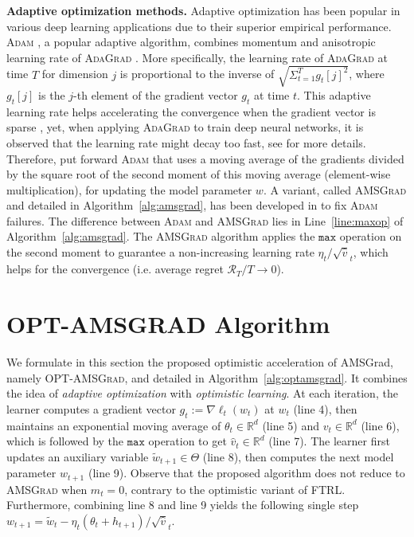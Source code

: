 \documentclass[wcp]{jmlr}
\begin{document}
\textbf{Adaptive optimization methods.}\hspace{0.1cm}
Adaptive optimization has been popular in various deep learning applications due to their superior empirical performance.
\textsc{Adam} \citep{KB15}, a popular adaptive algorithm, combines momentum \citep{P64} and anisotropic learning rate of \textsc{AdaGrad} \citep{DHS11}.
More specifically, the learning rate of \textsc{AdaGrad} at time $T$ for dimension $j$ is proportional to the inverse of $\sqrt{ \Sigma_{t=1}^T g_t[j]^2 }$, where $g_t[j]$ is the $j$-th element of the gradient vector $g_t$ at time $t$.
This adaptive learning rate helps accelerating the convergence when the gradient vector is sparse \citep{DHS11}, yet, when applying \textsc{AdaGrad} to train deep neural networks, it is observed that the learning rate might decay too fast, see \citep{KB15} for more details.
Therefore, \cite{KB15} put forward \textsc{Adam} that uses a moving average of the gradients divided by the square root of the second moment of this moving average (element-wise multiplication), for updating the model parameter $w$.
A variant, called \textsc{AMSGrad} and detailed in Algorithm~\ref{alg:amsgrad}, has been developed in \citep{RKK18} to fix \textsc{Adam} failures.
The difference between \textsc{Adam} and \textsc{AMSGrad} lies in Line~\ref{line:maxop} of Algorithm~\ref{alg:amsgrad}.
The \textsc{AMSGrad} algorithm \citep{RKK18} applies the $\texttt{max}$ operation on the second moment to guarantee a non-increasing learning rate $\eta_t / \sqrt{\hat{v}}_t $, which helps for the convergence (i.e. average regret $\mathcal{R}_T/T \rightarrow 0$).


\section{\textsc{OPT-AMSGRAD} Algorithm}\label{sec:opt}
\vspace{-0.05in}





We formulate in this section the proposed optimistic acceleration of AMSGrad, namely \textsc{OPT-AMSGrad}, and detailed in Algorithm~\ref{alg:optamsgrad}.  
It combines the idea of \emph{adaptive optimization} with \emph{optimistic learning}. 
At each iteration, the learner computes a gradient vector $g_{t}:= \nabla \ell_t( w_t)$ at $w_{t}$ (line 4), then maintains an exponential moving average of $\theta_{t} \in \mathbb R^{d}$ (line 5) and $v_{t} \in \mathbb R^{d}$ (line 6), which is followed by the $\texttt{max}$ operation to get $\hat{v}_{t} \in \mathbb R^{d}$ (line 7). 
The learner first updates an auxiliary variable $\tilde{w}_{t+1} \in \Theta$ (line 8), then computes the next model parameter $w_{t+1}$ (line 9).
Observe that the proposed algorithm does not reduce to \textsc{AMSGrad} when $m_{t}=0$, contrary to the optimistic variant of \textsc{FTRL}.
Furthermore, combining line 8 and line 9 yields the following single step $w_{t+1}= \tilde{w}_{t}  - \eta_t (\theta_t + h_{t+1} )/ \sqrt{\hat{v}}_t $. 
\end{document}
